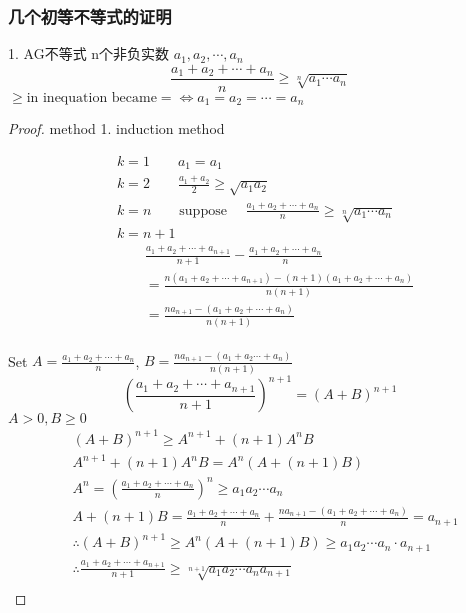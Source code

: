 \subsubsection{几个初等不等式的证明}
\begin{theorem}
{1. AG不等式}
n个非负实数 $ a_1,a_2,\cdots,a_n $ 
\begin{equation}
	\frac{a_1+a_2+\cdots+a_n}{n} \ge \sqrt[n]{a_1\cdots a_n}
\end{equation}
$\ge \text{in inequation became} = \iff a_1=a_2=\cdots=a_n$
\end{theorem}

\begin{proof}
	
	method 1. induction method

\begin{align*}
	&k=1 \qquad a_1 = a_1 \\
	&k=2 \qquad \frac{a_1+a_2}{2}\ge\sqrt{a_1a_2} \\	
	&k=n  \qquad \text{suppose }\quad \frac{a_1+a_2+\cdots+a_n}{n} \ge \sqrt[n]{a_1\cdots a_n}  \\
	&k = n+1\\ 	&\qquad\frac{a_1+a_2+\cdots+a_{n+1}}{n+1} - \frac{a_1+a_2+\cdots+a_{n}}{n} \\
	&\qquad=\frac{n(a_1+a_2+\cdots+a_{n+1})-(n+1)(a_1+a_2+\cdots+a_n)}{n(n+1)} \\
	&\qquad=\frac{na_{n+1}-(a_1+a_2+\cdots+a_n)}{n(n+1)}  \\
\end{align*}




Set $ A = \frac{a_1+a_2+\cdots+a_n}{n} $, $ B = \frac{na_{n+1} - (a_1+a_2\cdots+a_n)}{n(n+1)} $\\
\begin{equation*}
	(\frac{a_1+a_2+\cdots+a_{n+1}}{n+1})^{n+1} = (A+B)^{n+1}
\end{equation*}
$ A>0, B\ge 0$
\begin{align*}
	&(A+B)^{n+1} \ge A^{n+1}+(n+1)A^n B\\
	&A^{n+1} + (n+1)A^n B = A^n(A+(n+1)B)\\	
	&A^n = (\frac{a_1+a_2+\cdots+a_n}{n})^n \ge a_1a_2\cdots a_n\\
	&A + (n+1)B = \frac{a_1+a_2+\cdots+a_n}{n} + \frac{na_{n+1}-(a_1+a_2+\cdots+a_n)}{n} = a_{n+1}\\
	&\therefore (A+B)^{n+1} \ge A^n(A+(n+1)B)\ge a_1a_2\cdots a_n\cdot a_{n+1}\\
	&\therefore \frac{a_1+a_2+\cdots+a_{n+1}}{n+1} \ge \sqrt[n+1]{a_1a_2\cdots a_na_{n+1}}\\
\end{align*}


\end{proof}

